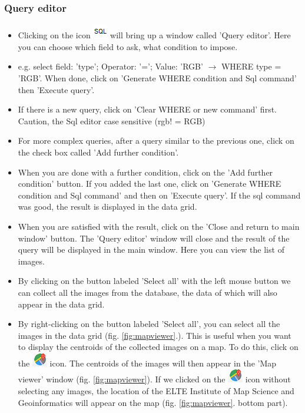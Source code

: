 \documentclass[a4paper,12pt]{article}
\begin{document}
\subsubsection{Query editor}

\begin{itemize}
	\item  Clicking on the icon \includegraphics {sql.png} will bring up a window called 'Query editor'. Here you can choose which field to ask, what condition to impose. 
	
	\item e.g. select field: 'type'; Operator: '='; Value: 'RGB' $\rightarrow$ WHERE type = 'RGB'. When done, click on 'Generate WHERE condition and Sql command' then 'Execute query'. 
	
	\item If there is a new query, click on 'Clear WHERE or new command' first. Caution, the Sql editor case sensitive (rgb! = RGB) 
	
	\item For more complex queries, after a query similar to the previous one, click on the check box called 'Add further condition'.  
	
	\item When you are done with a further condition, click on the 'Add further condition' button. If you added the last one, click on 'Generate WHERE condition and Sql command' and then on 'Execute query'. If the sql command was good, the result is displayed in the data grid. 
	
	\item When you are satisfied with the result, click on the 'Close and return to main window' button. The 'Query editor' window will close and the result of the query will be displayed in the main window. Here you can view the list of images. 
	
	\item By clicking on the button labeled 'Select all' with the left mouse button we can collect all the images from the database, the data of which will also appear in the data grid. 
	
	\item By right-clicking on the button labeled 'Select all', you can select all the images in the data grid (fig. \ref {fig:mapviewer}.). This is useful when you want to display the centroids of the collected images on a map. To do this, click on the  \includegraphics [width = 0.5 cm] {mapviewer_ikon.png} icon. The centroids of the images will then appear in the 'Map viewer' window (fig. \ref {fig:mapviewer}). If we clicked on the \includegraphics [width = 0.5 cm] {mapviewer_ikon.png} icon without selecting any images, the location of the ELTE Institute of Map Science and Geoinformatics will appear on the map (fig. \ref {fig:mapviewer}. bottom part). 
	

\end{itemize}
\end{document}
